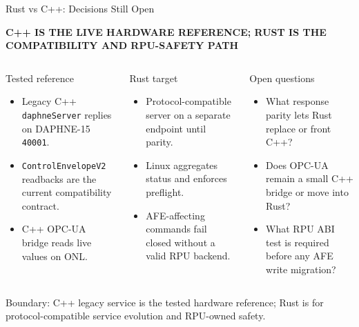\documentclass[aspectratio=169,10pt]{beamer}
\newcommand{\eyebrow}[1]{{\color{noircyan}\small\bfseries #1\par}}
\newcommand{\tightitem}{\setlength{\itemsep}{0.8mm}\setlength{\parskip}{0pt}}
\begin{document}
\begin{frame}[t]{Rust vs C++: Decisions Still Open}
\eyebrow{C++ IS THE LIVE HARDWARE REFERENCE; RUST IS THE COMPATIBILITY AND RPU-SAFETY PATH}
\vspace{1mm}

\begin{columns}[T,onlytextwidth]
\begin{exampleblock}{Tested reference}
\scriptsize
\begin{itemize}\tightitem
  \item Legacy C++ \texttt{daphneServer} replies on DAPHNE-15 \texttt{40001}.
  \item \texttt{ControlEnvelopeV2} readbacks are the current compatibility contract.
  \item C++ OPC-UA bridge reads live values on ONL.
\end{itemize}
\end{exampleblock}

\begin{block}{Rust target}
\scriptsize
\begin{itemize}\tightitem
  \item Protocol-compatible server on a separate endpoint until parity.
  \item Linux aggregates status and enforces preflight.
  \item AFE-affecting commands fail closed without a valid RPU backend.
\end{itemize}
\end{block}

\begin{alertblock}{Open questions}
\scriptsize
\begin{itemize}\tightitem
  \item What response parity lets Rust replace or front C++?
  \item Does OPC-UA remain a small C++ bridge or move into Rust?
  \item What RPU ABI test is required before any AFE write migration?
\end{itemize}
\end{alertblock}
\end{columns}

\vspace{2mm}
{\footnotesize
Boundary: C++ legacy service is the tested hardware reference; Rust is for protocol-compatible service evolution and RPU-owned safety.
}
\end{frame}
\end{document}
